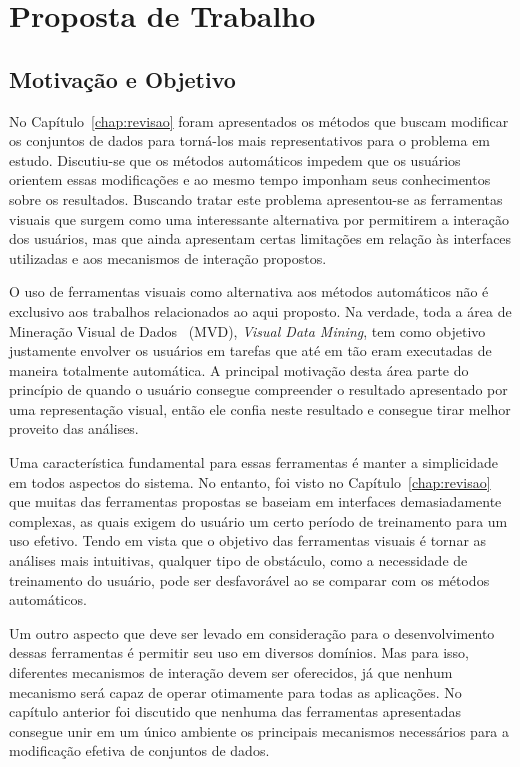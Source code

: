 \chapter{Proposta de Trabalho}\label{chap:proposta}

\section{Motivação e Objetivo}

No Capítulo~\ref{chap:revisao} foram apresentados os
métodos que buscam modificar os conjuntos de dados para 
torná-los mais representativos para o problema em estudo. 
Discutiu-se que os métodos automáticos impedem que os
usuários orientem essas modificações e ao mesmo tempo
imponham seus conhecimentos sobre os resultados. 
Buscando tratar este problema apresentou-se as ferramentas 
visuais que surgem como uma interessante alternativa
por permitirem a interação dos usuários, mas que ainda
apresentam certas limitações em relação às interfaces
utilizadas e  aos mecanismos de interação propostos.

O uso de ferramentas visuais como alternativa aos métodos
automáticos não é exclusivo aos trabalhos relacionados
ao aqui proposto. Na verdade, toda a área de
Mineração Visual de Dados~\cite{Wong1999} (MVD),
\emph{Visual Data Mining}, tem como objetivo justamente
envolver os usuários em tarefas que até em tão eram
executadas de maneira totalmente automática. A principal
motivação desta área parte do princípio de quando o usuário
consegue compreender o resultado apresentado por uma
representação visual, então ele confia neste resultado e
consegue tirar melhor proveito das análises.

Uma característica fundamental para essas ferramentas é manter a
simplicidade em todos aspectos do sistema. No entanto, foi
visto no Capítulo~\ref{chap:revisao} que muitas das
ferramentas propostas se baseiam em interfaces
demasiadamente complexas, as quais exigem do usuário um
certo período de treinamento para um uso efetivo. Tendo em
vista que o objetivo das ferramentas visuais é tornar as
análises mais intuitivas, qualquer tipo de obstáculo, como
a necessidade de treinamento do usuário, pode ser
desfavorável ao se comparar com os métodos automáticos.

Um outro aspecto que deve ser levado em consideração para o
desenvolvimento dessas ferramentas é permitir seu uso em
diversos domínios. Mas para isso, diferentes mecanismos de
interação devem ser oferecidos, já que nenhum mecanismo
será capaz de operar otimamente para todas as aplicações.
No capítulo anterior foi discutido que nenhuma
das ferramentas apresentadas consegue unir em um único
ambiente os principais mecanismos necessários para a
modificação efetiva de conjuntos de dados.

